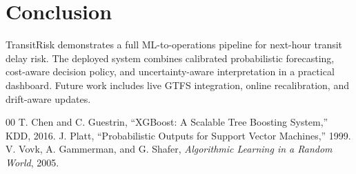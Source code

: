 \documentclass[conference]{IEEEtran}
\begin{document}
\section{Conclusion}
TransitRisk demonstrates a full ML-to-operations pipeline for next-hour transit delay risk. The deployed system combines calibrated probabilistic forecasting, cost-aware decision policy, and uncertainty-aware interpretation in a practical dashboard. Future work includes live GTFS integration, online recalibration, and drift-aware updates.


\begin{thebibliography}{00}
 T. Chen and C. Guestrin, ``XGBoost: A Scalable Tree Boosting System,'' KDD, 2016.
 J. Platt, ``Probabilistic Outputs for Support Vector Machines,'' 1999.
 V. Vovk, A. Gammerman, and G. Shafer, \textit{Algorithmic Learning in a Random World}, 2005.
\end{thebibliography}
\end{document}
